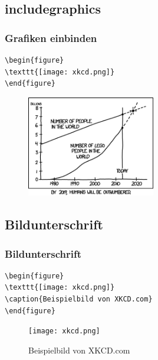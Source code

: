 \subsection{includegraphics}
\begin{frame}[fragile]
\frametitle{Grafiken einbinden}
\begin{codeblock}
\begin{verbatim}
\begin{figure}
\texttt{[image: xkcd.png]}
\end{figure}
\end{verbatim}
\end{codeblock}
\pause 
 \begin{figure}
      \includegraphics[width=0.5\textwidth]{images/xkcd.png}
 \end{figure}
\end{frame}

\subsection{Bildunterschrift}
\begin{frame}[fragile]
\frametitle{Bildunterschrift}
 
\begin{codeblock}
\begin{verbatim}
\begin{figure}
\texttt{[image: xkcd.png]}
\caption{Beispielbild von XKCD.com}
\end{figure}
\end{verbatim}
\end{codeblock}
    \begin{figure}
      \texttt{[image: xkcd.png]}
      \caption{Beispielbild von XKCD.com}
    \end{figure}
\end{frame}

